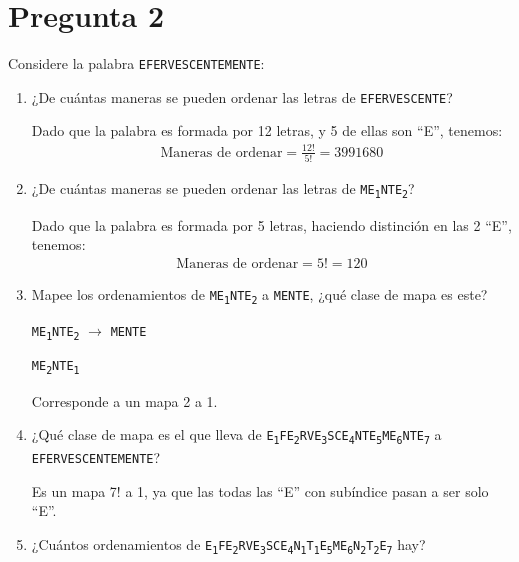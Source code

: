\documentclass[spanish, fleqn]{article}
\begin{document}
	\section*{Pregunta 2}
	Considere la palabra \texttt{EFERVESCENTEMENTE}:
    \begin{enumerate}
    \item ¿De cuántas maneras se pueden ordenar las letras de \texttt{EFERVESCENTE}?
    
    Dado que la palabra es formada por 12 letras, y 5 de ellas son ``E'', tenemos:
    \begin{align*}
    \text{Maneras de ordenar}=\frac{12!}{5!}= 3991680
    \end{align*}
    \item ¿De cuántas maneras se pueden ordenar las letras de \texttt{ME\textsubscript{1}NTE\textsubscript{2}}?
    
    Dado que la palabra es formada por 5 letras, haciendo distinción en las 2 ``E'', tenemos:
    \begin{align*}
    \text{Maneras de ordenar}=5!= 120
    \end{align*}
    \item Mapee los ordenamientos de \texttt{ME\textsubscript{1}NTE\textsubscript{2}} a \texttt{MENTE}, ¿qué clase de mapa es este?
    
    \texttt{ME\textsubscript{1}NTE\textsubscript{2}} $\rightarrow$ \texttt{MENTE}    
   
    \vspace{-0.2cm}\texttt{ME\textsubscript{2}NTE\textsubscript{1}} 
    
    Corresponde a un mapa 2 a 1.
    \item ¿Qué clase de mapa es el que lleva de \texttt{E\textsubscript{1}FE\textsubscript{2}RVE\textsubscript{3}SCE\textsubscript{4}NTE\textsubscript{5}ME\textsubscript{6}NTE\textsubscript{7}} a  \texttt{EFERVESCENTEMENTE}?
    
    Es un mapa 7! a 1, ya que las todas las ``E'' con subíndice pasan a ser solo ``E''.
    
    \item ¿Cuántos ordenamientos de \texttt{E\textsubscript{1}FE\textsubscript{2}RVE\textsubscript{3}SCE\textsubscript{4}N\textsubscript{1}T\textsubscript{1}E\textsubscript{5}ME\textsubscript{6}N\textsubscript{2}T\textsubscript{2}E\textsubscript{7}} hay?
    

\end{enumerate}
\end{document}
